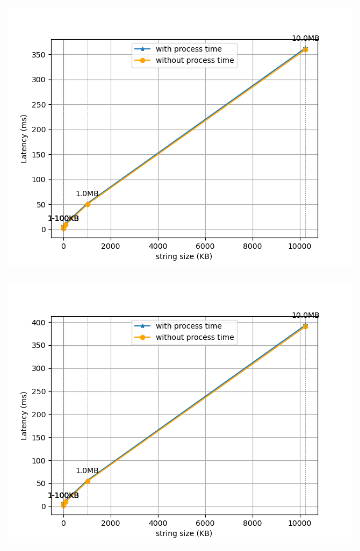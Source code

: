 \begin{figure}[htb]
    \begin{subfigure}[b]{0.49\textwidth}
        \centering
        \includegraphics[width=\textwidth]{figures/tests/proportional_tests/Rest_Average_string_messages_sending_time_of_100_tests.png}\hfill 
        \caption{} \label{fig: proportional-rest-stringsize-a}
    \end{subfigure}
    \begin{subfigure}[b]{0.49\textwidth}
        \centering
        \includegraphics[width=\textwidth]{figures/tests/proportional_tests/Rest_Average_string_messages_receiving_time_of_100_tests.png}\hfill 
        \caption{} \label{fig: proportional-rest-stringsize-b}
        \end{subfigure}

\end{figure}
